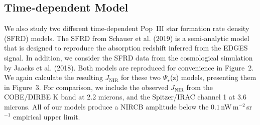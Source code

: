 \documentclass[11pt,twoside]{article}
\begin{document}

\subsection{Time-dependent Model}
We also study two different time-dependent Pop~III star formation rate density (SFRD) models. The SFRD from Schauer et al. (2019) is a semi-analytic model that is designed to reproduce the absorption redshift inferred from the EDGES signal. In addition, we consider the SFRD data from the 
cosmological simulation by Jaacks et al. (2018). Both models are reproduced for convenience in Figure~2. We again calculate 
the resulting $J_\mathrm{NIR}$ for these two $\Psi_{\star}$(z) models, presenting them in Figure~3. For comparison, we include the observed $J_\mathrm{NIR}$ from the COBE/DIRBE K band at 2.2 microns, and the Spitzer/IRAC channel 1 at 3.6 microns. All of our models produce a NIRCB amplitude below the $0.1$\,nW\,m$^{-2}$\,sr$^{-1}$ empirical upper limit. 

\end{document}
